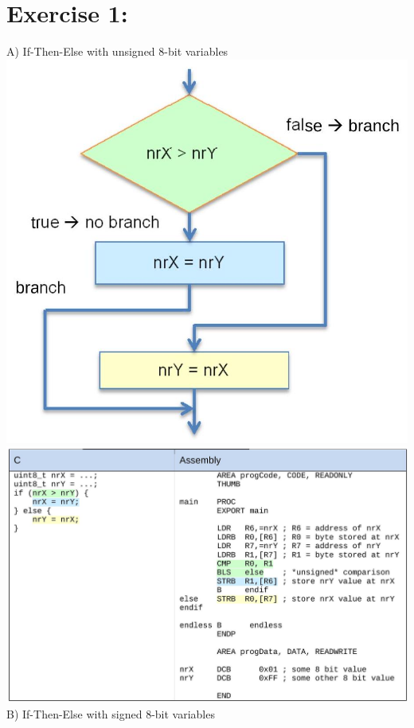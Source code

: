 \documentclass[10pt]{article}
\begin{document}
\section*{Exercise 1:}
A) If-Then-Else with unsigned 8-bit variables\\
\includegraphics[width=\linewidth]{images/2025_01_02_7eee2d56b23c0199f878g-5}\\
\includegraphics[width=\linewidth]{images/2025_01_02_7eee2d56b23c0199f878g-5(1)}\\
B) If-Then-Else with signed 8-bit variables\\
\end{document}
